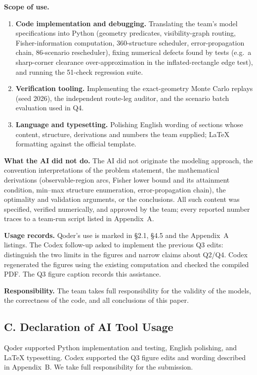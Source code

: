 \medskip
\noindent\textbf{Scope of use.}
\begin{enumerate}
\item \textbf{Code implementation and debugging.} Translating the team's
model specifications into Python (geometry predicates, visibility-graph routing,
Fisher-information computation, 360-structure scheduler, error-propagation chain,
86-scenario rescheduler), fixing numerical defects found by tests (e.g.\ a
sharp-corner clearance over-approximation in the inflated-rectangle edge test), and
running the 51-check regression suite.
\item \textbf{Verification tooling.} Implementing the exact-geometry Monte Carlo
replays (seed 2026), the independent route-leg auditor, and the scenario batch
evaluation used in Q4.
\item \textbf{Language and typesetting.} Polishing English wording of sections whose
content, structure, derivations and numbers the team supplied; \LaTeX{} formatting
against the official template.
\end{enumerate}

\medskip
\noindent\textbf{What the AI did not do.} The AI did not originate the modeling
approach, the convention interpretations of the problem statement, the mathematical
derivations (observable-region arcs, Fisher lower bound and its attainment condition,
min--max structure enumeration, error-propagation chain), the optimality and
validation arguments, or the conclusions. All such content was specified, verified
numerically, and approved by the team; every reported number traces to a team-run
script listed in Appendix~A.

\medskip
\noindent\textbf{Usage records.} Qoder's use is marked in \S2.1, \S4.5 and the
Appendix~A listings. The Codex follow-up asked to implement the previous Q3 edits:
distinguish the two limits in the figures and narrow claims about Q2/Q4. Codex
regenerated the figures using the existing computation and checked the compiled
PDF. The Q3 figure caption records this assistance.

\medskip
\noindent\textbf{Responsibility.} The team takes full responsibility for the validity
of the models, the correctness of the code, and all conclusions of this paper.

\subsection*{C. Declaration of AI Tool Usage}

Qoder supported Python implementation and testing, English polishing, and
\LaTeX{} typesetting. Codex supported the Q3 figure edits and wording described
in Appendix~B. We take full responsibility for the submission.
